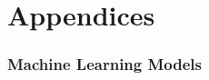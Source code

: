 \documentclass[NOTE, atlasdraft=true, texlive=2016, UKenglish]{\ATLASLATEXPATH atlasdoc}
\begin{document}
\printbibliography
%
%

\clearpage
{}


\clearpage
\appendix
\part*{Appendices}

\section{Machine Learning Models}
\label{apx:MVA}
%

\end{document}
